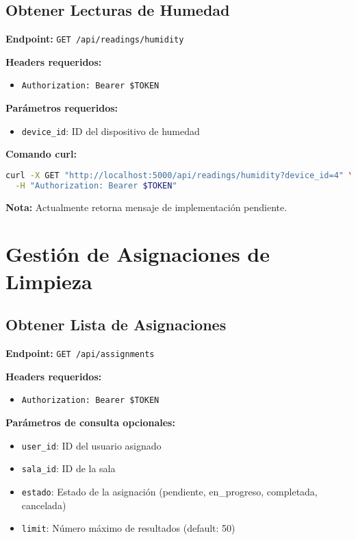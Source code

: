 \documentclass[12pt,a4paper]{article}
\begin{document}
\subsection{Obtener Lecturas de Humedad}

\textbf{Endpoint:} \texttt{GET /api/readings/humidity}

\textbf{Headers requeridos:}
\begin{itemize}
\item \texttt{Authorization: Bearer \$TOKEN}
\end{itemize}

\textbf{Parámetros requeridos:}
\begin{itemize}
\item \texttt{device\_id}: ID del dispositivo de humedad
\end{itemize}

\textbf{Comando curl:}
\begin{lstlisting}[language=bash]
curl -X GET "http://localhost:5000/api/readings/humidity?device_id=4" \
  -H "Authorization: Bearer $TOKEN"
\end{lstlisting}

\textbf{Nota:} Actualmente retorna mensaje de implementación pendiente.

\section{Gestión de Asignaciones de Limpieza}

\subsection{Obtener Lista de Asignaciones}

\textbf{Endpoint:} \texttt{GET /api/assignments}

\textbf{Headers requeridos:}
\begin{itemize}
\item \texttt{Authorization: Bearer \$TOKEN}
\end{itemize}

\textbf{Parámetros de consulta opcionales:}
\begin{itemize}
\item \texttt{user\_id}: ID del usuario asignado
\item \texttt{sala\_id}: ID de la sala
\item \texttt{estado}: Estado de la asignación (pendiente, en\_progreso, completada, cancelada)
\item \texttt{limit}: Número máximo de resultados (default: 50)
\end{itemize}
\end{document}
